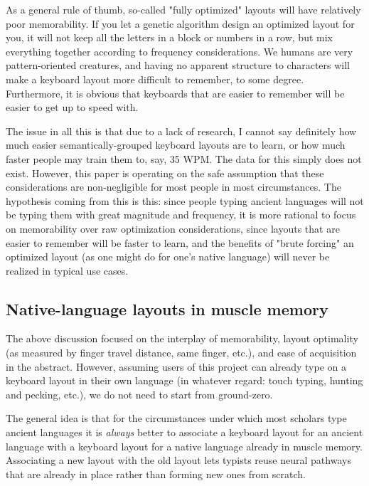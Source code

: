 \documentclass[11pt]{article}
\begin{document}
As a general rule of thumb, so-called "fully optimized" layouts will have relatively poor memorability. If you let a genetic algorithm design an optimized layout for you, it will not keep all the letters in a block or numbers in a row, but mix everything together according to frequency considerations. We humans are very pattern-oriented creatures, and having no apparent structure to characters will make a keyboard layout more difficult to remember, to some degree. Furthermore, it is obvious that keyboards that are easier to remember will be easier to get up to speed with.

The issue in all this is that due to a lack of research, I cannot say definitely how much easier semantically-grouped keyboard layouts are to learn, or how much faster people may train them to, say, 35 WPM. The data for this simply does not exist. However, this paper is operating on the safe assumption that these considerations are non-negligible for most people in most circumstances. The hypothesis coming from this is this: since people typing ancient languages will not be typing them with great magnitude and frequency, it is more rational to focus on memorability over raw optimization considerations, since layouts that are easier to remember will be faster to learn, and the benefits of "brute forcing" an optimized layout (as one might do for one's native language) will never be realized in typical use cases.

\subsection{Native-language layouts in muscle memory}
\label{sec:org91611cf}

The above discussion focused on the interplay of memorability, layout optimality (as measured by finger travel distance, same finger, etc.), and ease of acquisition in the abstract. However, assuming users of this project can already type on a keyboard layout in their own language (in whatever regard: touch typing, hunting and pecking, etc.), we do not need to start from ground-zero.

The general idea is that for the circumstances under which most scholars type ancient languages it is \emph{always} better to associate a keyboard layout for an ancient language with a keyboard layout for a native language already in muscle memory. Associating a new layout with the old layout lets typists reuse neural pathways that are already in place rather than forming new ones from scratch.
\end{document}
